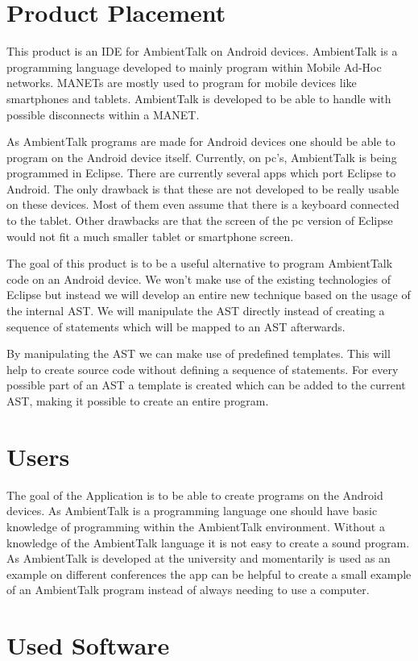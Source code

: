 \documentclass[a4paper,12pt]{report}
\begin{document}
\section{Product Placement}
This product is an IDE for AmbientTalk on Android devices. AmbientTalk is a programming language developed to mainly program within Mobile Ad-Hoc networks. MANETs are mostly used to program
for mobile devices like smartphones and tablets. AmbientTalk is developed to be able to handle with possible disconnects within a MANET.

As AmbientTalk programs are made for Android devices one should be able to program on the Android device itself. Currently, on pc's, AmbientTalk is being programmed in Eclipse. There are currently
several apps which port Eclipse to Android. The only drawback is that these are not developed to be really usable on these devices. Most of them even assume that there is a keyboard connected to the
tablet. Other drawbacks are that the screen of the pc version of Eclipse would not fit a much smaller tablet or smartphone screen.   

The goal of this product is to be a useful alternative to program AmbientTalk code on an Android device. We won't make use of the existing technologies of Eclipse but instead we will develop an entire
new technique based on the usage of the internal AST. We will manipulate the AST directly instead of creating a sequence of statements which will be mapped to an AST afterwards.

By manipulating the AST we can make use of predefined templates. This will help to create source code without defining a sequence of statements. For every possible part of an AST
a template is created which can be added to the current AST, making it possible to create an entire program. 
\section{Users}
The goal of the Application is to be able to create programs on the Android devices. As AmbientTalk is a programming language one should have basic knowledge of programming within the AmbientTalk
environment. Without a knowledge of the AmbientTalk language it is not easy to create a sound program.
As AmbientTalk is developed at the university and momentarily is used as an example on different conferences the app can be helpful to create a small example of an AmbientTalk program instead 
of always needing to use a computer.

\section{Used Software}
\end{document}
